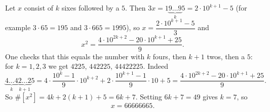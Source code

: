 Let $x$ consist of $k$ sixes followed by a $5$. Then $3x=1\underbrace{9\dots9}_{k}5=2\cdot10^{k+1}-5$ (for example $3\cdot65=195$ and $3\cdot665=1995$), so $x=\dfrac{2\cdot10^{k+1}-5}{3}$ and
\[
x^2=\dfrac{4\cdot10^{2k+2}-20\cdot10^{k+1}+25}{9}.
\]
One checks that this equals the number with $k$ fours, then $k+1$ twos, then a $5$: for $k=1,2,3$ we get $4225$, $442225$, $44422225$. Indeed
\[
\underbrace{4\dots4}_{k}\underbrace{2\dots2}_{k+1}5=4\cdot\dfrac{10^k-1}{9}\cdot10^{k+2}+2\cdot\dfrac{10^{k+1}-1}{9}\cdot10+5=\dfrac{4\cdot10^{2k+2}-20\cdot10^{k+1}+25}{9}.
\]
So $\#[x^2]=4k+2(k+1)+5=6k+7$. Setting $6k+7=49$ gives $k=7$, so
\[
x=\boxed{66666665}.
\]
